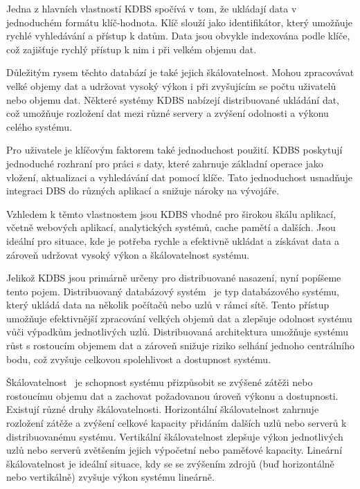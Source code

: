 \documentclass[czech,master,dept460,male,csharp,cpdeclaration]{diploma}
\begin{document}
	Jedna z hlavních vlastností KDBS spočívá v tom, že ukládají data v jednoduchém formátu klíč-hodnota. Klíč slouží jako identifikátor, který umožňuje rychlé vyhledávání a přístup k datům. Data jsou obvykle indexována podle klíče, což zajišťuje rychlý přístup k nim i při velkém objemu dat.
	
	Důležitým rysem těchto databází je také jejich škálovatelnost. Mohou zpracovávat velké objemy dat a udržovat vysoký výkon i při zvyšujícím se počtu uživatelů nebo objemu dat. Některé systémy KDBS nabízejí distribuované ukládání dat, což umožňuje rozložení dat mezi různé servery a zvýšení odolnosti a výkonu celého systému.
	
	Pro uživatele je klíčovým faktorem také jednoduchost použití. KDBS poskytují jednoduché rozhraní pro práci s daty, které zahrnuje základní operace jako vložení, aktualizaci a vyhledávání dat pomocí klíče. Tato jednoduchost usnadňuje integraci DBS do různých aplikací a snižuje nároky na vývojáře.
	
	Vzhledem k těmto vlastnostem jsou KDBS vhodné pro širokou škálu aplikací, včetně webových aplikací, analytických systémů, cache pamětí a dalších. Jsou ideální pro situace, kde je potřeba rychle a efektivně ukládat a získávat data a zároveň udržovat vysoký výkon a škálovatelnost systému.
	
	Jelikož KDBS jsou primárně určeny pro distribuované nasazení, nyní popíšeme tento pojem. Distribuovaný databázový systém~\cite{ddbs} je typ databázového systému, který ukládá data na několik počítačů nebo uzlů v rámci sítě. Tento přístup umožňuje efektivnější zpracování velkých objemů dat a zlepšuje odolnost systému vůči výpadkům jednotlivých uzlů. Distribuovaná architektura umožňuje systému růst s rostoucím objemem dat a zároveň snižuje riziko selhání jednoho centrálního bodu, což zvyšuje celkovou spolehlivost a dostupnost systému.
	
	Škálovatelnost~\cite{scalability}\label{scaling-dbs} je schopnost systému přizpůsobit se zvýšené zátěži nebo rostoucímu objemu dat a zachovat požadovanou úroveň výkonu a dostupnosti. Existují různé druhy škálovatelnosti. Horizontální škálovatelnost zahrnuje rozložení zátěže a zvýšení celkové kapacity přidáním dalších uzlů nebo serverů k distribuovanému systému. Vertikální škálovatelnost zlepšuje výkon jednotlivých uzlů nebo serverů zvětšením jejich výpočetní nebo paměťové kapacity. Lineární škálovatelnost je ideální situace, kdy se se zvýšením zdrojů (buď horizontálně nebo vertikálně) zvyšuje výkon systému lineárně.
	
\end{document}
